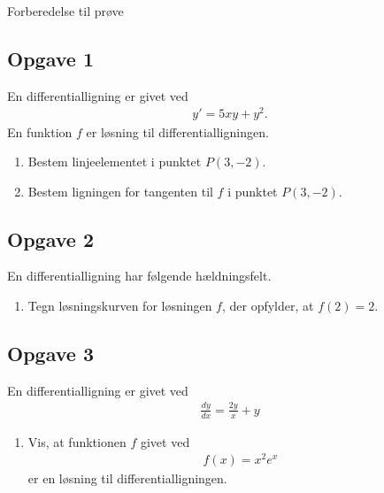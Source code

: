 \begin{center}
	\Huge
	Forberedelse til prøve
\end{center}

\subsection*{Opgave 1}

En differentialligning er givet ved
\begin{align*}
	y' = 5xy + y^2.
\end{align*}
En funktion $f$ er løsning til differentialligningen.
\begin{enumerate}[label=\roman*)]
	\item Bestem linjeelementet i punktet $P(3,-2)$.
	\item Bestem ligningen for tangenten til $f$ i punktet $P(3,-2)$.
\end{enumerate}

\subsection*{Opgave 2}
En differentialligning har følgende hældningsfelt. 
\begin{center}
\end{center}
\begin{enumerate}[label=\roman*)]
	\item Tegn løsningskurven for løsningen $f$, der opfylder, at $f(2) = 2$. 
\end{enumerate}

\subsection*{Opgave 3}
En differentialligning er givet ved
\begin{align*}
	\frac{dy}{dx} = \frac{2y}{x} + y
\end{align*}
\begin{enumerate}[label = \roman*)]
	\item Vis, at funktionen $f$ givet ved
	\begin{align*}
		f(x) = x^2e^x 
	\end{align*}
	er en løsning til differentialligningen. 
\end{enumerate}
\newpage
